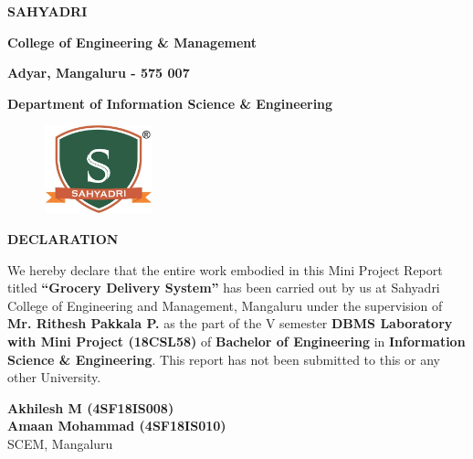 \documentclass[12pt,a4paper]{report}
\begin{document}
\newpage
\begin{center}
{\LARGE \textbf{SAHYADRI}}
\par
\vspace{6pt}
{\Large \textbf{College of Engineering \& Management}}
\par
\vspace{3pt}
{\large \textbf{Adyar, Mangaluru - 575 007}}
\par
\vspace{0.25in}
{\large \textbf{Department of Information Science \& Engineering}}
\par
\begin{figure}[hbtp]
\centering
\includegraphics[width=1.25in,height=1in]{../fig/registered}
\end{figure}
{\Large \textbf{DECLARATION}} 
\end{center}
\par
\vspace{0.10in}
\noindent We hereby declare that the entire work embodied in this Mini Project Report titled
\textbf{``Grocery Delivery System''} has been carried out by us at Sahyadri College of Engineering and Management, Mangaluru under the supervision of \textbf{Mr. Rithesh Pakkala P.} as the part of the V semester \textbf{DBMS Laboratory with Mini Project (18CSL58)} of \textbf{Bachelor of Engineering} in \textbf{Information Science \& Engineering}. This report has not been submitted to this or any other University.\\
\vspace{0.25in}
\begin{flushright}
\textbf{Akhilesh M (4SF18IS008)}\\
\textbf{Amaan Mohammad (4SF18IS010)}\\
SCEM, Mangaluru \\
\end{flushright}

\end{document}
